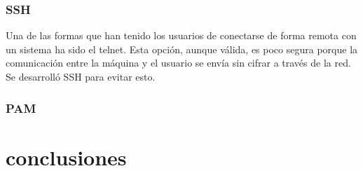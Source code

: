 \documentclass[titlepage]{article}
\begin{document}
\subsubsection{\Gls{SSH}}
Una de las formas que han tenido los usuarios de conectarse de forma remota con un sistema ha sido el \Gls{telnet}. Esta opción, aunque válida, es poco segura porque la comunicación entre la máquina y el usuario se envía sin cifrar a través de la red.\\Se desarrolló SSH para evitar esto.

\subsubsection{\Gls{PAM}}
\section{conclusiones}
\clearpage
\printbibliography[heading=bibintoc,title={Bibliografía}]
\end{document}
